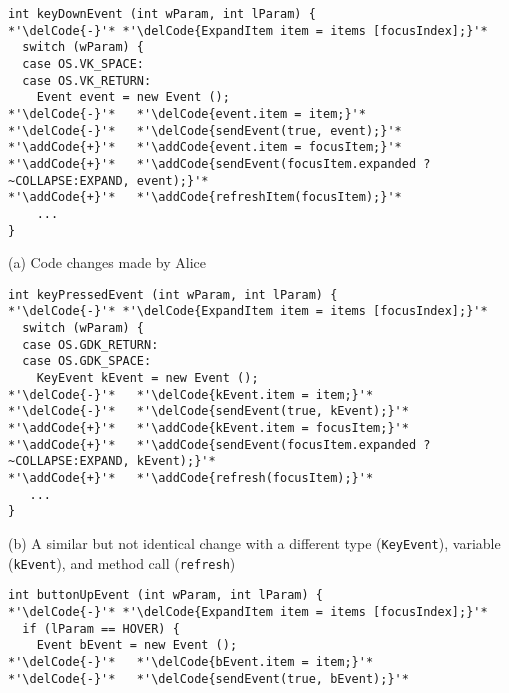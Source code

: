 \begin{figure*}[!t]
\begin{minipage}[t]{0.5\linewidth}
\begin{lstlisting}[style=MyJavaSmallStyle]
int keyDownEvent (int wParam, int lParam) {
*'\delCode{-}'* *'\delCode{ExpandItem item = items [focusIndex];}'*
  switch (wParam) {
  case OS.VK_SPACE:
  case OS.VK_RETURN:
    Event event = new Event ();
*'\delCode{-}'*   *'\delCode{event.item = item;}'*
*'\delCode{-}'*   *'\delCode{sendEvent(true, event);}'*
*'\addCode{+}'*   *'\addCode{event.item = focusItem;}'*
*'\addCode{+}'*   *'\addCode{sendEvent(focusItem.expanded ?~COLLAPSE:EXPAND, event);}'*
*'\addCode{+}'*   *'\addCode{refreshItem(focusItem);}'*
    ...
}
\end{lstlisting}
\begin{scriptsize}(a) Code changes made by {\sf Alice}\end{scriptsize}
\end{minipage}
%
\begin{minipage}[t]{0.5\linewidth}
\begin{lstlisting}[style=MyJavaSmallStyle]
int keyPressedEvent (int wParam, int lParam) {
*'\delCode{-}'* *'\delCode{ExpandItem item = items [focusIndex];}'*
  switch (wParam) {
  case OS.GDK_RETURN:
  case OS.GDK_SPACE:
    KeyEvent kEvent = new Event ();
*'\delCode{-}'*   *'\delCode{kEvent.item = item;}'*
*'\delCode{-}'*   *'\delCode{sendEvent(true, kEvent);}'*
*'\addCode{+}'*   *'\addCode{kEvent.item = focusItem;}'*
*'\addCode{+}'*   *'\addCode{sendEvent(focusItem.expanded ?~COLLAPSE:EXPAND, kEvent);}'*
*'\addCode{+}'*   *'\addCode{refresh(focusItem);}'*
   ...
}
\end{lstlisting}
\begin{scriptsize}(b) A similar but not identical change with a different type (\texttt{KeyEvent}), variable (\texttt{kEvent}), and method call (\texttt{refresh})\end{scriptsize}
\end{minipage}
%
\begin{minipage}[t]{0.5\linewidth}
\begin{lstlisting}[style=MyJavaSmallStyle]
int buttonUpEvent (int wParam, int lParam) {
*'\delCode{-}'* *'\delCode{ExpandItem item = items [focusIndex];}'*
  if (lParam == HOVER) {
    Event bEvent = new Event ();
*'\delCode{-}'*   *'\delCode{bEvent.item = item;}'*
*'\delCode{-}'*   *'\delCode{sendEvent(true, bEvent);}'*

\end{lstlisting}
\end{minipage}
\end{figure*}
